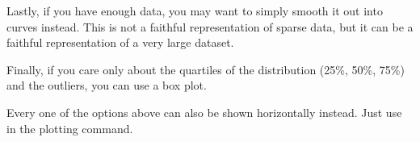 \documentclass[letterpaper,10pt,english]{jupyterBook}
\begin{document}
\noindent{}

\sphinxAtStartPar
Lastly, if you have enough data, you may want to simply smooth it out into curves instead.  This is not a faithful representation of sparse data, but it can be a faithful representation of a very large dataset.

\begin{sphinxVerbatim}[commandchars=\\\{\}]
   
  
\end{sphinxVerbatim}

\noindent{}

\sphinxAtStartPar
Finally, if you care only about the quartiles of the distribution (25\%, 50\%, 75\%) and the outliers, you can use a box plot.

\begin{sphinxVerbatim}[commandchars=\\\{\}]
   
  
\end{sphinxVerbatim}

\noindent{}

\sphinxAtStartPar
Every one of the options above can also be shown horizontally instead.  Just use  in the plotting command.

\begin{sphinxVerbatim}[commandchars=\\\{\}]
    
  
\end{sphinxVerbatim}
\end{document}
